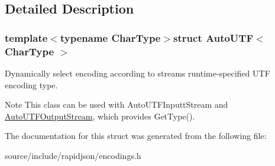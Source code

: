 \subsection{Detailed Description}
\subsubsection*{template$<$typename Char\+Type$>$struct Auto\+U\+T\+F$<$ Char\+Type $>$}

Dynamically select encoding according to stream\textquotesingle{}s runtime-\/specified U\+T\+F encoding type. 

\begin{DoxyNote}{Note}
This class can be used with Auto\+U\+T\+F\+Inputt\+Stream and \hyperlink{class_auto_u_t_f_output_stream}{Auto\+U\+T\+F\+Output\+Stream}, which provides Get\+Type(). 
\end{DoxyNote}


The documentation for this struct was generated from the following file\+:\begin{DoxyCompactItemize}
\item 
source/include/rapidjson/encodings.\+h\end{DoxyCompactItemize}
